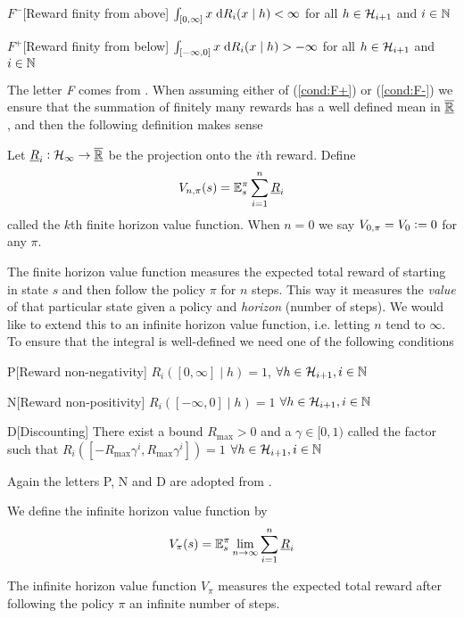 \begin{cond}{$F^-$}[Reward finity from above]
  $\int_{[0,\infty]} x \; \mathrm{d} R_i(x \mid h) < \infty$ for all
  $h \in \mathcal{H}_{i+1}$ and $i \in \mathbb{N}$
  \label{cond:F-}
\end{cond}
\begin{cond}{$F^+$}[Reward finity from below]
  $\int_{[-\infty,0]} x \; \mathrm{d} R_i(x \mid h) > -\infty$ for all
  $h \in \mathcal{H}_{i+1}$ and $i \in \mathbb{N}$
  \label{cond:F+}
\end{cond}
The letter \emph{F} comes from .
When assuming either of (\cref{cond:F+}) or (\cref{cond:F-})
we ensure that the summation of finitely many rewards
has a well defined mean in $\overline{\underline{\mathbb{R}}}$,
and then the following definition makes sense 
\begin{defn}
  Let $\underline{R}_i : \mathcal{H}_\infty \to \overline{\underline{\mathbb{R}}}$ be the projection onto the
  $i$th reward. Define
  \[ V_{n,\pi}(s) = \mathbb{E}_s^\pi \sum_{i=1}^n \underline{R}_i \]
  called the $k$th finite horizon value function.
  When $n=0$ we say $V_{0,\pi} = V_0 \vcentcolon= 0$ for any $\pi$.
\end{defn}
The finite horizon value function
measures the expected total reward of starting in state $s$
and then follow the policy $\pi$ for $n$ steps.
This way it measures the \emph{value} of that particular state
given a policy and \emph{horizon} (number of steps).
We would like to extend this to an infinite horizon value function,
i.e. letting $n$ tend to $\infty$. To ensure that the integral is well-defined
we need one of the following conditions
\begin{cond}{P}[Reward non-negativity] $R_i([0,\infty] \mid h) = 1$,
  $\forall h \in \mathcal{H}_{i+1}, i \in \mathbb{N}$
  \label{cond:P}
\end{cond}
\begin{cond}{N}[Reward non-positivity] $R_i([-\infty, 0] \mid h) = 1$
  $\forall h \in \mathcal{H}_{i+1}, i \in \mathbb{N}$
  \label{cond:N} 
\end{cond}
\begin{cond}{D}[Discounting] There exist a bound $R_{\max} > 0$ and a
  $\gamma \in [0,1)$ called the  factor such that
  $R_i([-R_{\max} \gamma^i, R_{\max} \gamma^i]) = 1$
  $\forall h \in \mathcal{H}_{i+1}, i \in \mathbb{N}$
  \label{cond:D}
\end{cond}
Again the letters P, N and D are adopted from .
\begin{defn}
  We define the infinite horizon value function by
  \[ V_\pi(s) = \mathbb{E}_s^\pi \lim_{n \to \infty} \sum_{i=1}^n \underline{R}_i \]
\end{defn}
The infinite horizon value function $V_\pi$ measures the expected total
reward after following the policy $\pi$ an infinite number of steps.

